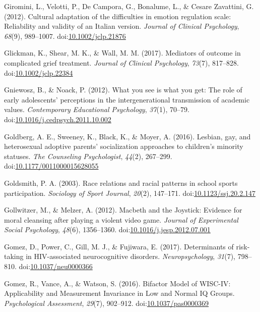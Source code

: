 \documentclass[english,man]{apa6}
\begin{document}
\hypertarget{ref-Giromini2012}{}
Giromini, L., Velotti, P., De Campora, G., Bonalume, L., \& Cesare
Zavattini, G. (2012). Cultural adaptation of the difficulties in emotion
regulation scale: Reliability and validity of an Italian version.
\emph{Journal of Clinical Psychology}, \emph{68}(9), 989--1007.
doi:\href{https://doi.org/10.1002/jclp.21876}{10.1002/jclp.21876}

\hypertarget{ref-Glickman2017}{}
Glickman, K., Shear, M. K., \& Wall, M. M. (2017). Mediators of outcome
in complicated grief treatment. \emph{Journal of Clinical Psychology},
\emph{73}(7), 817--828.
doi:\href{https://doi.org/10.1002/jclp.22384}{10.1002/jclp.22384}

\hypertarget{ref-Gniewosz2012}{}
Gniewosz, B., \& Noack, P. (2012). What you see is what you get: The
role of early adolescents' perceptions in the intergenerational
transmission of academic values. \emph{Contemporary Educational
Psychology}, \emph{37}(1), 70--79.
doi:\href{https://doi.org/10.1016/j.cedpsych.2011.10.002}{10.1016/j.cedpsych.2011.10.002}

\hypertarget{ref-Goldberg2016}{}
Goldberg, A. E., Sweeney, K., Black, K., \& Moyer, A. (2016). Lesbian,
gay, and heterosexual adoptive parents' socialization approaches to
children's minority statuses. \emph{The Counseling Psychologist},
\emph{44}(2), 267--299.
doi:\href{https://doi.org/10.1177/0011000015628055}{10.1177/0011000015628055}

\hypertarget{ref-Goldsmith2003}{}
Goldsmith, P. A. (2003). Race relations and racial patterns in school
sports participation. \emph{Sociology of Sport Journal}, \emph{20}(2),
147--171.
doi:\href{https://doi.org/10.1123/ssj.20.2.147}{10.1123/ssj.20.2.147}

\hypertarget{ref-Gollwitzer2012}{}
Gollwitzer, M., \& Melzer, A. (2012). Macbeth and the Joystick: Evidence
for moral cleansing after playing a violent video game. \emph{Journal of
Experimental Social Psychology}, \emph{48}(6), 1356--1360.
doi:\href{https://doi.org/10.1016/j.jesp.2012.07.001}{10.1016/j.jesp.2012.07.001}

\hypertarget{ref-Gomez2017}{}
Gomez, D., Power, C., Gill, M. J., \& Fujiwara, E. (2017). Determinants
of risk-taking in HIV-associated neurocognitive disorders.
\emph{Neuropsychology}, \emph{31}(7), 798--810.
doi:\href{https://doi.org/10.1037/neu0000366}{10.1037/neu0000366}

\hypertarget{ref-Gomez2017a}{}
Gomez, R., Vance, A., \& Watson, S. (2016). Bifactor Model of WISC-IV:
Applicability and Measurement Invariance in Low and Normal IQ Groups.
\emph{Psychological Assessment}, \emph{29}(7), 902--912.
doi:\href{https://doi.org/10.1037/pas0000369}{10.1037/pas0000369}
\end{document}
